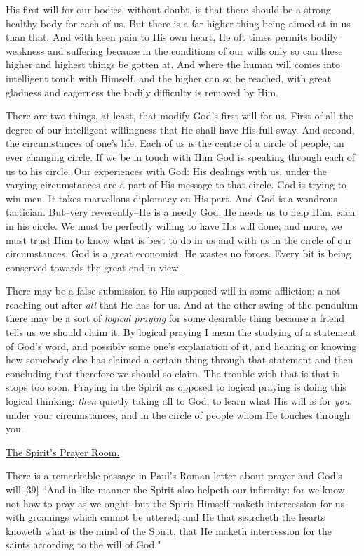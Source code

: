 His first will for our bodies, without doubt, is that there should be a
strong healthy body for each of us. But there is a far higher thing being
aimed at in us than that. And with keen pain to His own heart, He oft
times permits bodily weakness and suffering because in the conditions of
our wills only so can these higher and highest things be gotten at. And
where the human will comes into intelligent touch with Himself, and the
higher can so be reached, with great gladness and eagerness the bodily
difficulty is removed by Him.

There are two things, at least, that modify God's first will for us. First
of all the degree of our intelligent willingness that He shall have His
full sway. And second, the circumstances of one's life. Each of us is the
centre of a circle of people, an ever changing circle. If we be in touch
with Him God is speaking through each of us to his circle. Our experiences
with God: His dealings with us, under the varying circumstances are a part
of His message to that circle. God is trying to win men. It takes
marvellous diplomacy on His part. And God is a wondrous tactician.
But--very reverently--He is a needy God. He needs us to help Him, each in
his circle. We must be perfectly willing to have His will done; and more,
we must trust Him to know what is best to do in us and with us in the
circle of our circumstances. God is a great economist. He wastes no
forces. Every bit is being conserved towards the great end in view.

There may be a false submission to His supposed will in some affliction; a
not reaching out after \textit{all} that He has for us. And at the other swing of
the pendulum there may be a sort of \textit{logical praying} for some desirable
thing because a friend tells us we should claim it. By logical praying I
mean the studying of a statement of God's word, and possibly some one's
explanation of it, and hearing or knowing how somebody else has claimed a
certain thing through that statement and then concluding that therefore we
should so claim. The trouble with that is that it stops too soon. Praying
in the Spirit as opposed to logical praying is doing this logical
thinking: \textit{then} quietly taking all to God, to learn what His will is for
\textit{you}, under your circumstances, and in the circle of people whom He
touches through you.



\underline{The Spirit's Prayer Room.}


There is a remarkable passage in Paul's Roman letter about prayer and
God's will.[39] ``And in like manner the Spirit also helpeth our infirmity:
for we know not how to pray as we ought; but the Spirit Himself maketh
intercession for us with groanings which cannot be uttered; and He that
searcheth the hearts knoweth what is the mind of the Spirit, that He
maketh intercession for the saints according to the will of God."


